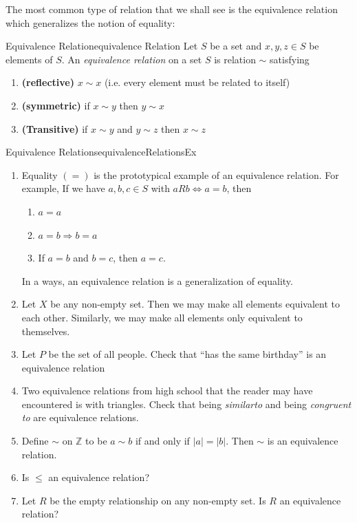 \documentclass{book}
\newcommand{\Z}{{\mathbb{Z}}}
\newcommand{\Rw}{\Rightarrow}
\newcommand{\LRw}{\Leftrightarrow}
\begin{document}
The most common type of relation that we shall see is the equivalence relation which generalizes the notion of
equality:
\begin{defn}{Equivalence Relation}{equivalence Relation}
	Let $S$ be a set and $x,y,z \in S$ be elements of $S$. An \emph{equivalence relation} on a set $S$ is relation $\sim$ satisfying
	\begin{enumerate}
		\item \textbf{(reflective)} $x\sim x$ (i.e. every element must be related to itself)
		\item \textbf{(symmetric)} if $x\sim y$ then $y\sim x$
		\item \textbf{(Transitive)} if $x\sim y$ and $y\sim z$ then $x \sim z$
	\end{enumerate}
\end{defn}

\begin{example}{Equivalence Relations}{equivalenceRelationsEx}
	\begin{enumerate}
		\item Equality $(=)$ is the prototypical example of an equivalence relation. For example, If we have $a,b,c \in S$
			with $aRb \LRw a = b$, then
			\begin{enumerate}
				\item $a = a$
				\item $a =b \Rw b = a$
				\item If $a = b$ and $b = c$, then $a = c$.
			\end{enumerate}
			In a ways, an equivalence relation is a generalization of equality.
		\item Let $X$ be any non-empty set. Then we may make all elements equivalent to each other.
			Similarly, we may make all elements only equivalent to themselves.
		\item Let $P$ be the set of all people. Check that ``has the same birthday'' is an equivalence
			relation
		\item Two equivalence relations from high school that the reader may have encountered is with
			triangles. Check that being \emph{similarto} and being \emph{congruent to} are equivalence
			relations.
		\item Define $\sim$ on $\Z$ to be $a \sim b$ if and only if $|a| = |b|$. Then $\sim$ is an equivalence
			relation.
		\item Is $\le$ an equivalence relation?
		\item Let $R$ be the empty relationship on any non-empty set. Is $R$ an equivalence relation?
	\end{enumerate}
\end{example}
\end{document}
